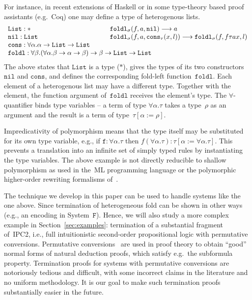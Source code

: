 \documentclass[a4paper,UKenglish,cleveref,autoref,numberwithinsect]{lipics-v2019}
\theoremstyle{definition}
\newcommand{\arrtype}{\rightarrow}
\newcommand{\subst}[2]{#1:=#2}
\newcommand{\red}{\longrightarrow}
\newcommand{\List}{\mathtt{List}}
\newcommand{\nil}{\mathtt{nil}}
\newcommand{\cons}{\mathtt{cons}}
\begin{document}
For instance, in recent extensions of Haskell or in some type-theory
based proof assistants (e.g.~Coq) one may define a type of
heterogenous lists.
\[
\begin{array}{ll}
  \List : * &
  \mathtt{foldl}_\sigma(f,a,\nil) \red a \\
  \mathtt{nil} : \List &
  \mathtt{foldl}_\sigma(f,a,\cons_\tau(x,l)) \red \mathtt{foldl}_\sigma(f,f \tau a x,l) \\
  \mathtt{cons} : \forall \alpha . \alpha \arrtype \List \arrtype \List \quad\quad \\
  \multicolumn{2}{l}{\mathtt{foldl} : \forall \beta . (\forall \alpha . \beta \arrtype \alpha \arrtype \beta) \arrtype \beta \arrtype \List \arrtype \List}
\end{array}
\]
The above states that $\List$ is a type ($*$), gives the types of its
two constructors $\nil$ and $\cons$, and defines the corresponding
fold-left function~$\mathtt{foldl}$. Each element of a heterogenous
list may have a different type. Together with the element, the function argument
of~$\mathtt{foldl}$ receives the element's type. The
$\forall$-quantifier binds type variables -- a term of type $\forall
\alpha . \tau$ takes a type~$\rho$ as an argument and the result is a
term of type~$\tau[\subst{\alpha}{\rho}]$.

Impredicativity of polymorphism means that the type itself may be
substituted for its own type variable, e.g., if $\mathtt{f} : \forall
\alpha . \tau$ then $f (\forall \alpha . \tau) :
\tau[\subst{\alpha}{\forall\alpha.\tau}]$. This prevents a translation
into an infinite set of simply typed rules by instantiating the type
variables. The above example is not directly reducible to shallow
polymorphism as used in the~ML programming language or the polymorphic
higher-order rewriting formalisms of~\cite{jou:oka:91,jou:rub:99}.

The technique we develop in this paper can be used to handle
systems like the one above.  Since termination of heterogeneous
fold can be shown in other ways (e.g., an encoding in
System~$\mathtt{F}$). Hence, we will also study a more complex example
in Section~\ref{sec:examples}: termination of a substantial fragment
of~IPC2, i.e., full intuitionistic second-order propositional logic
with permutative conversions. Permutative
conversions~\cite[Chapter~6]{TroelstraSchwichtenberg1996} are used in
proof theory to obtain ``good'' normal forms of natural deduction
proofs, which satisfy e.g.~the subformula property. Termination proofs
for systems with permutative conversions are notoriously tedious and
difficult, with some incorrect claims in the literature and no uniform
methodology. It is our goal to make such termination proofs
substantially easier in the future.
\end{document}
